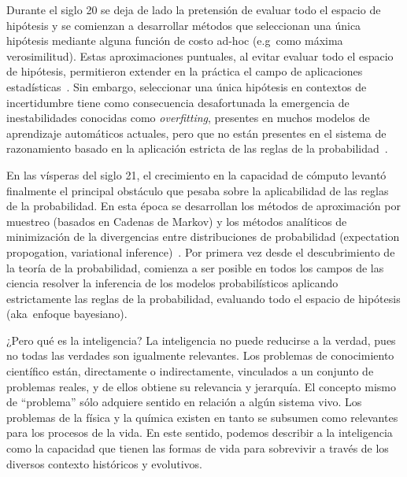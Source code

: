 \documentclass[10pt]{article}
\begin{document}

Durante el siglo 20 se deja de lado la pretensión de evaluar todo el espacio de hipótesis y se comienzan a desarrollar métodos que seleccionan una única hipótesis mediante alguna función de costo ad-hoc (e.g~como máxima verosimilitud).
Estas aproximaciones puntuales, al evitar evaluar todo el espacio de hipótesis, permitieron extender en la práctica el campo de aplicaciones estadísticas~\cite{friedman2001-elementsOfStatisticalLearning}.
Sin embargo, seleccionar una única hipótesis en contextos de incertidumbre tiene como consecuencia desafortunada la emergencia de inestabilidades conocidas como \emph{overfitting}, presentes en muchos modelos de aprendizaje automáticos actuales, pero que no están presentes en el sistema de razonamiento basado en la aplicación estricta de las reglas de la probabilidad~\cite{bishop2006-PRML}.


En las vísperas del siglo 21, el crecimiento en la capacidad de cómputo levantó finalmente el principal obstáculo que pesaba sobre la aplicabilidad de las reglas de la probabilidad.
En esta época se desarrollan los métodos de aproximación por muestreo (basados en Cadenas de Markov) y los métodos analíticos de minimización de la divergencias entre distribuciones de probabilidad (expectation propogation, variational inference)~\cite{bishop2006-PRML}.
Por primera vez desde el descubrimiento de la teoría de la probabilidad, comienza a ser posible en todos los campos de las ciencia resolver la inferencia de los modelos probabilísticos aplicando estrictamente las reglas de la probabilidad, evaluando todo el espacio de hipótesis (aka~enfoque bayesiano).


¿Pero qué es la inteligencia?
La inteligencia no puede reducirse a la verdad, pues no todas las verdades son igualmente relevantes.
Los problemas de conocimiento científico están, directamente o indirectamente, vinculados a un conjunto de problemas reales, y de ellos obtiene su relevancia y jerarquía.
El concepto mismo de ``problema'' sólo adquiere sentido en relación a algún sistema vivo.
Los problemas de la física y la química existen en tanto se subsumen como relevantes para los procesos de la vida.
En este sentido, podemos describir a la inteligencia como la capacidad que tienen las formas de vida para sobrevivir a través de los diversos contexto históricos y evolutivos.

\end{document}
